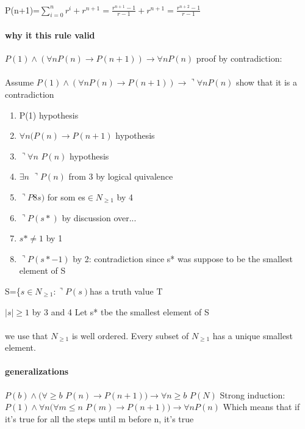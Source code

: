\documentclass[a4paper,10pt]{article}
\begin{document}
{\paragraph{}
P(n+1)=$\sum_{i=0}^nr^i+r^{n+1}=\frac{r^{n+1}-1}{r-1}+r^{n+1}=\frac{r^{n+2}-1}{r-1}$
\paragraph{why it this rule valid}
$P(1)\wedge(\forall nP(n)\rightarrow P(n+1))\rightarrow \forall nP(n)$
\newline
proof by contradiction:
\paragraph{}
Assume
\newline
$P(1)\wedge(\forall nP(n)\rightarrow P(n+1))\rightarrow \urcorner\forall nP(n)$
show that it is a contradiction 
\begin{enumerate}
 \item P(1) hypothesis
 \item $\forall n (P(n)\rightarrow P(n+1)$ hypothesis
 \item $\urcorner\forall n$ $P(n)$ hypothesis
 \item $\exists n$  $ \urcorner P(n)$ from 3 by logical quivalence
 \item $\urcorner P8s)$ for som es$\in N_{\geq1}$ by 4
 \item $\urcorner P(s*)$ by discussion over...
 \item $s*\neq 1$ by 1
 \item $\urcorner P(s*-1)$ by 2: contradiction since s* was suppose to be the smallest element of S
\end{enumerate}
S=\{$ s\in N_{\geq 1}:\urcorner P(s)$has a truth value T}
$|s|\geq 1$ by  3 and 4
\newline
Let s* tbe the smallest element of S
\paragraph{}
we use that $N_{\geq 1}$ is well ordered. Every subset of $N_{\geq 1}$ has a unique smallest element.
\paragraph{generalizations}
$P(b)\wedge(\forall\geq b$ $P(n)\rightarrow P(n+1))\rightarrow\forall n\geq b$ $P(N)$
\newline
Strong induction: $P(1)\wedge \forall n(\forall m\leq n$ $P(m)\rightarrow P(n+1))\rightarrow\forall n P(n)$
Which means that if it's true for all the steps until m before n, it's true 
\end{document}
